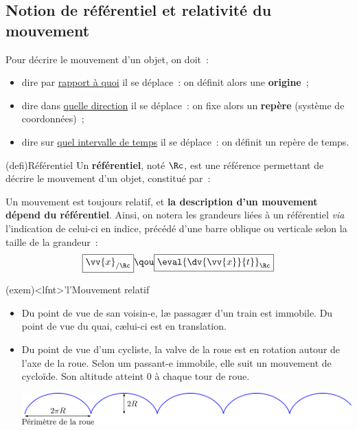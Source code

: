 \documentclass[../../main/main.tex]{subfiles}
\begin{document}
\subsection{Notion de référentiel et relativité du mouvement}

Pour décrire le mouvement d'un objet, on doit~:
\begin{itemize}
	\item dire par \underline{rapport à quoi} il se déplace~: on définit alors
	      une \textbf{origine}~;
	\item dire dans \underline{quelle direction} il se déplace~: on fixe alors
	      un \textbf{repère} (système de coordonnées)~;
	\item dire sur \underline{quel intervalle de temps} il se déplace~: on
	      définit un repère de temps.
\end{itemize}

\begin{tcb*}(defi){Référentiel}
	Un \textbf{référentiel}, noté $\Rc$, est une référence permettant de décrire
	le mouvement d'un objet, constitué par~:
\end{tcb*}

Un mouvement est toujours relatif, et \textbf{la description d'un mouvement
	dépend du référentiel}. Ainsi, on notera les grandeurs liées à un référentiel
\textit{via} l'indication de celui-ci en indice, précédé d'une barre oblique ou
verticale selon la taille de la grandeur~:
\[  \boxed{\vv{x}_{/\Rc}}
	\qou
	\boxed{\eval{\dv{\vv{x}}{t}}_{\Rc}}\]

\begin{tcb*}(exem)<lfnt>'l'{Mouvement relatif}
	\begin{itemize}
		\item Du point de vue de san voisin-e, læ passagær d'un train est
		      immobile. Du point de vue du quai, cælui-ci est en translation.
		\item Du point de vue d'um cycliste, la valve de la roue est en rotation
		      autour de l'axe de la roue. Selon um passant-e immobile, elle suit
		      un mouvement de cycloïde. Son altitude atteint $0$ à chaque tour de
		      roue.
		      \begin{center}
			      \includegraphics[width=\linewidth]{roue}
		      \end{center}
	\end{itemize}
\end{tcb*}
\end{document}

